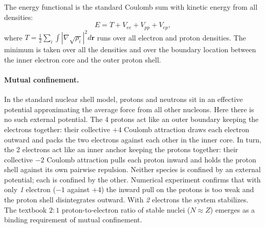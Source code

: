 \documentclass[11pt]{article}
\begin{document}
The energy functional is the standard Coulomb sum with kinetic energy from all densities:
\begin{equation}
E = T + V_{ee} + V_{pp} + V_{ep},
\end{equation}
where $T = \tfrac{1}{2}\sum_i \int |\nabla \sqrt{\rho_i}|^2 d\mathbf{r}$ runs over all electron and proton densities. The minimum is taken over all the densities and over the boundary location between the inner electron core and the outer proton shell.

\paragraph{Mutual confinement.}
In the standard nuclear shell model, protons and neutrons sit in an effective potential approximating the average force from all other nucleons. Here there is no such external potential. The 4 protons act like an outer boundary keeping the electrons together: their collective $+4$ Coulomb attraction draws each electron outward and packs the two electrons against each other in the inner core. In turn, the 2 electrons act like an inner anchor keeping the protons together: their collective $-2$ Coulomb attraction pulls each proton inward and holds the proton shell against its own pairwise repulsion. Neither species is confined by an external potential; each is confined by the other. Numerical experiment confirms that with only \emph{1} electron ($-1$ against $+4$) the inward pull on the protons is too weak and the proton shell disintegrates outward. With \emph{2} electrons the system stabilizes. The textbook $2{:}1$ proton-to-electron ratio of stable nuclei ($N \approx Z$) emerges as a binding requirement of mutual confinement.
\end{document}
